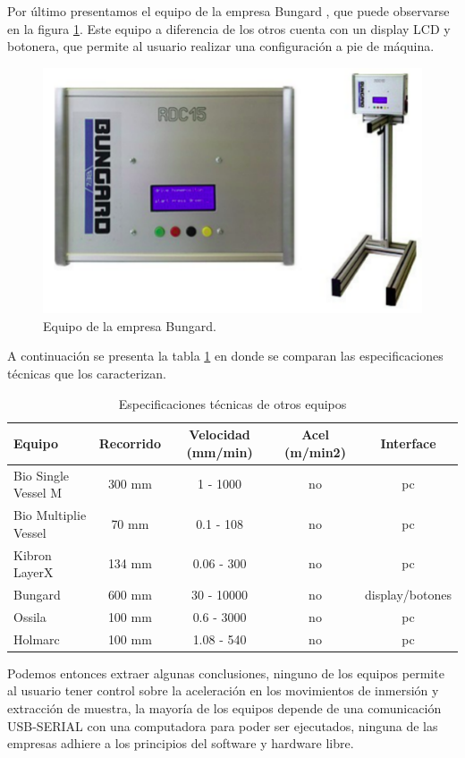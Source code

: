 Por último presentamos el equipo de la empresa Bungard \citep{6_web_bungard}, que puede observarse en la figura \ref{fig:dip_bungard}.
Este equipo a diferencia de los otros cuenta con un display LCD y botonera, que permite al usuario realizar una configuración a pie de máquina.

\begin{figure}[htbp]
	\centering
	\includegraphics[width=.45\textwidth]{./Figures/6_bungard.pdf}
	\caption{Equipo de la empresa Bungard.}
	\label{fig:dip_bungard}
\end{figure}

A continuación se presenta la tabla \ref{tab:equipos_competencia} en donde se comparan las especificaciones técnicas que los caracterizan.

\begin{table}[h]
	\centering
	\caption[Dip coaters en el mercado]{Especificaciones técnicas de otros equipos}
	\begin{tabular}{l c c c c}    
		\toprule
		\textbf{Equipo} 	 & \textbf{Recorrido}  & \textbf{Velocidad (mm/min)}  & \textbf{Acel (m/min2)}  & \textbf{Interface} \\
		\midrule
		Bio Single Vessel M	& 300 mm 	& 1    - 1000   & no & pc 							\\		
		Bio Multiplie Vessel		& 70  mm	& 0.1  - 108 	& no & pc					\\
		Kibron LayerX				& 134 mm	& 0.06 - 300	& no & pc					\\
		Bungard						& 600 mm	& 30 - 10000	& no & display/botones		\\
		Ossila \citep{4_web_ossila}					& 100 mm	& 0.6  - 3000	& no & pc		\\
		Holmarc	\citep{5_web_holmarc}					& 100 mm	& 1.08 - 540	& no & pc		\\
		\bottomrule
		\hline
	\end{tabular}
	\label{tab:equipos_competencia}
\end{table}

Podemos entonces extraer algunas conclusiones, ninguno de los equipos permite al usuario tener control sobre la aceleración en los movimientos de inmersión y extracción de muestra, la mayoría  de los equipos depende de una comunicación USB-SERIAL con una computadora para poder ser ejecutados, ninguna de las empresas adhiere a los principios del software y hardware libre.  

